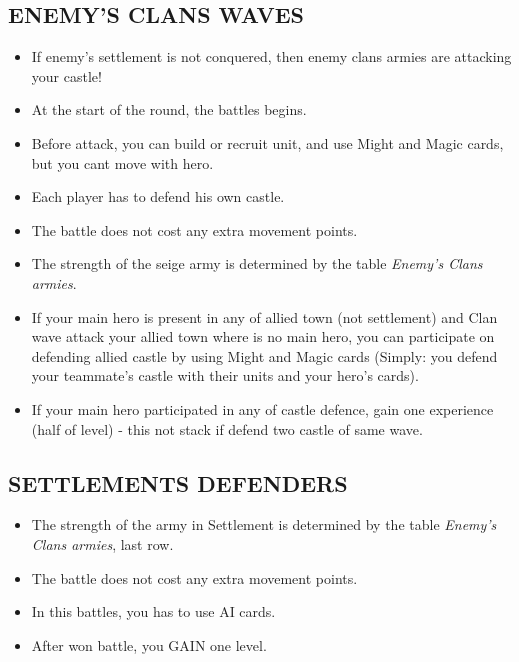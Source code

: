 \begin{multicols*}{2}
\subsection*{\MakeUppercase{Enemy's clans waves}}
\begin{itemize}
  \item If enemy's settlement is not conquered, then enemy clans armies are attacking your castle!
  \item At the start of the round, the battles begins.
  \item Before attack, you can build or recruit unit, and use Might and Magic cards, but you cant move with hero.
  \item Each player has to defend his own castle.
  \item The battle does not cost any extra movement points.
  \item The strength of the seige army is determined by the table \textit{Enemy's Clans armies}.
  \item If your main hero is present in any of allied town (not settlement) and Clan wave attack your allied town where is no main hero, you can participate on defending allied castle by using Might and Magic cards (Simply: you defend your teammate's castle with their units and your hero's cards).
  \item If your main hero participated in any of castle defence, gain one experience (half of level) - this not stack if defend two castle of same wave.
\end{itemize}

\subsection*{\MakeUppercase{Settlements defenders}}
\begin{itemize}
  \item The strength of the army in Settlement is determined by the table \textit{Enemy's Clans armies}, last row.
  \item The battle does not cost any extra movement points.
  \item In this battles, you has to use AI cards.
  \item After won battle, you GAIN one level.
\end{itemize}

\end{multicols*}

